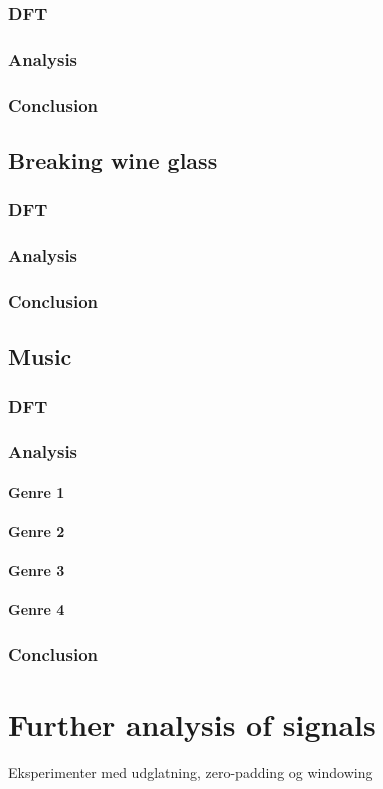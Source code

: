 \subsubsection{DFT}

\subsubsection{Analysis}

\subsubsection{Conclusion}

\subsection{Breaking wine glass}
\subsubsection{DFT}

\subsubsection{Analysis}

\subsubsection{Conclusion}

\subsection{Music}
\subsubsection{DFT}

\subsubsection{Analysis}

\paragraph{Genre 1}

\paragraph{Genre 2}

\paragraph{Genre 3}

\paragraph{Genre 4}

\subsubsection{Conclusion}

\section{Further analysis of signals}
\label{sec:analysisOfSignals}
Eksperimenter med udglatning, zero-padding og windowing 